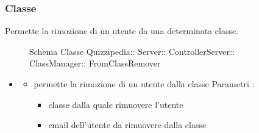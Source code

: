\subsubsection{Classe }
Permette la rimozione di un utente da una determinata classe.
\begin{figure}[H]
\centering
\noindent{}
\caption[Schema Classe FromClassRemover]{Schema Classe Quizzipedia:: Server:: ControllerServer:: ClassManager:: FromClassRemover}
\end{figure}
\begin{itemize}
\item {}
\begin{itemize}
\item {}
\newline
permette la rimozione di un utente dalla classe
\newline
Parametri :
\begin{itemize}
\item {}
\newline
classe dalla quale rimuovere l'utente
\item {}
\newline
email dell'utente da rimuovere dalla classe
\end{itemize}
\end{itemize}
\end{itemize}
